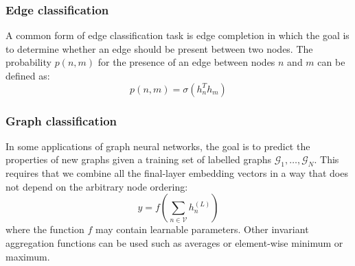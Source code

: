 \documentclass{beamer}
\begin{document}
\begin{frame}
    \frametitle{Edge classification}
    A common form of edge classification task is edge completion in which the goal is to determine whether an edge should be present between two nodes. The probability $p(n,m)$ for the presence of an edge between nodes $n$ and $m$ can be defined as:
    \begin{equation*}
        p(n,m)=\sigma(h_{n}^{T}h_{m})
    \end{equation*}
\end{frame}

\begin{frame}
    \frametitle{Graph classification}
    In some applications of graph neural networks, the goal is to predict the properties of new graphs given a training set of labelled graphs $\mathcal{G}_{1},\hdots,\mathcal{G}_{N}$. This requires that we combine all the final-layer embedding vectors in a way that does not depend on the arbitrary node ordering:
    \begin{equation*}
        y=f(\sum_{n\in\mathcal{V}}h^{(L)}_{n})
    \end{equation*}
    where the function $f$ may contain learnable parameters. Other invariant aggregation functions can be used such as averages or element-wise minimum or maximum.
\end{frame}
\end{document}
